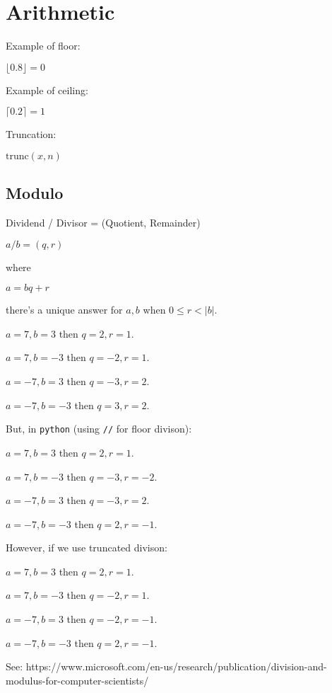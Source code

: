 \chapter{Arithmetic}

Example of floor:

$\lfloor 0.8 \rfloor = 0$

Example of ceiling:

$\lceil 0.2 \rceil = 1$

Truncation:

$\text{trunc}(x, n)$

\section{Modulo}

Dividend / Divisor = (Quotient, Remainder)

$a / b = (q, r)$

where

$a = bq + r$

there's a unique answer for $a, b$ when $0 \leq r < |b|$.

$a = 7, b = 3$ then $q = 2, r = 1$.

$a = 7, b = -3$ then $q = -2, r = 1$.

$a = -7, b = 3$ then $q = -3, r = 2$.

$a = -7, b = -3$ then $q = 3, r = 2$.

But, in \texttt{python} (using \texttt{//} for floor divison):

$a = 7, b = 3$ then $q = 2, r = 1$.

$a = 7, b = -3$ then $q = -3, r = -2$.

$a = -7, b = 3$ then $q = -3, r = 2$.

$a = -7, b = -3$ then $q = 2, r = -1$.

However, if we use truncated divison:

$a = 7, b = 3$ then $q = 2, r = 1$.

$a = 7, b = -3$ then $q = -2, r = 1$.

$a = -7, b = 3$ then $q = -2, r = -1$.

$a = -7, b = -3$ then $q = 2, r = -1$.

See: https://www.microsoft.com/en-us/research/publication/division-and-modulus-for-computer-scientists/
